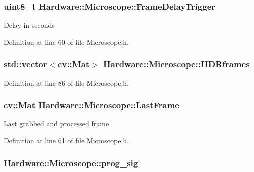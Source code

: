 \subsubsection[{Frame\+Delay\+Trigger}]{\setlength{\rightskip}{0pt plus 5cm}uint8\+\_\+t Hardware\+::\+Microscope\+::\+Frame\+Delay\+Trigger}\label{class_hardware_1_1_microscope_ac2da14781a22924a389fc287df3dbfda}
Delay in seconds 

Definition at line 60 of file Microscope.\+h.

\hypertarget{class_hardware_1_1_microscope_a2c73db8010320428db3fd41d840dd0eb}{}
\subsubsection[{H\+D\+Rframes}]{\setlength{\rightskip}{0pt plus 5cm}std\+::vector$<$cv\+::\+Mat$>$ Hardware\+::\+Microscope\+::\+H\+D\+Rframes\hspace{0.3cm}{\ttfamily [private]}}\label{class_hardware_1_1_microscope_a2c73db8010320428db3fd41d840dd0eb}


Definition at line 86 of file Microscope.\+h.

\hypertarget{class_hardware_1_1_microscope_afbbec8a14cd277cec7c3ee6ce0ba54a1}{}
\subsubsection[{Last\+Frame}]{\setlength{\rightskip}{0pt plus 5cm}cv\+::\+Mat Hardware\+::\+Microscope\+::\+Last\+Frame}\label{class_hardware_1_1_microscope_afbbec8a14cd277cec7c3ee6ce0ba54a1}
Last grabbed and processed frame 

Definition at line 61 of file Microscope.\+h.

\hypertarget{class_hardware_1_1_microscope_a819e11c0bfdb12b4c42b7ee2d330cb4d}{}
\subsubsection[{prog\+\_\+sig}]{ Hardware\+::\+Microscope\+::prog\+\_\+sig\hspace{0.3cm}{\ttfamily [private]}}\label{class_hardware_1_1_microscope_a819e11c0bfdb12b4c42b7ee2d330cb4d}


